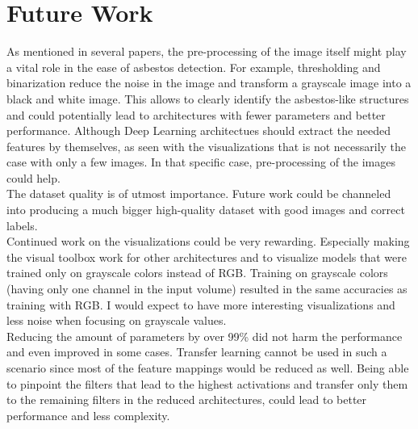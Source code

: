 \section{Future Work}

As mentioned in several papers, the pre-processing of the image itself might play a vital role in the ease of asbestos detection. For example, thresholding and binarization reduce the noise in the image and transform a grayscale image into a black and white image. This allows to clearly identify the asbestos-like structures and could potentially lead to architectures with fewer parameters and better performance. Although Deep Learning architectues should extract the needed features by themselves, as seen with the visualizations that is not necessarily the case with only a few images. In that specific case, pre-processing of the images could help.\\

The dataset quality is of utmost importance. Future work could be channeled into producing a much bigger high-quality dataset with good images and correct labels.\\

Continued work on the visualizations could be very rewarding. Especially making the visual toolbox work for other architectures and to visualize models that were trained only on grayscale colors instead of RGB. Training on grayscale colors (having only one channel in the input volume) resulted in the same accuracies as training with RGB. I would expect to have more interesting visualizations and less noise when focusing on grayscale values.\\

Reducing the amount of parameters by over 99\% did not harm the performance and even improved in some cases. Transfer learning cannot be used in such a scenario since most of the feature mappings would be reduced as well. Being able to pinpoint the filters that lead to the highest activations and transfer only them to the remaining filters in the reduced architectures, could lead to better performance and less complexity.\\
